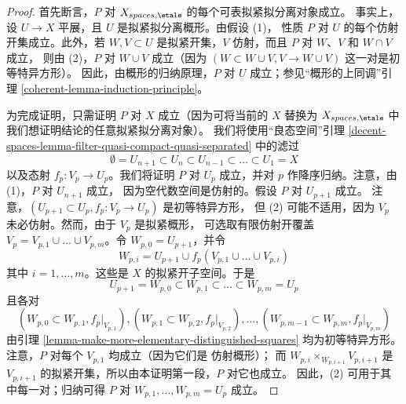 \begin{proof}
首先断言，$P$ 对 $X_{spaces, \etale}$ 的每个可表拟紧拟分离对象成立。
事实上，设 $U \to X$ 平展，且 $U$ 是拟紧拟分离概形。由假设 (1)，
性质 $P$ 对 $U$ 的每个仿射开集成立。此外，若 $W, V \subset U$
是拟紧开集，$V$ 仿射，而且 $P$ 对 $W$、$V$ 和 $W \cap V$ 成立，
则由 (2)，$P$ 对 $W \cup V$ 成立（因为
$(W \subset W \cup V, V \to W \cup V)$ 这一对是初等特异方形）。
因此，由概形的归纳原理，$P$ 对 $U$ 成立；参见“概形的上同调”引理
\ref{coherent-lemma-induction-principle}。

\medskip\noindent
为完成证明，只需证明 $P$ 对 $X$ 成立（因为可将当前的 $X$ 替换为
$X_{spaces, \etale}$ 中我们想证明结论的任意拟紧拟分离对象）。
我们将使用“良态空间”引理
\ref{decent-spaces-lemma-filter-quasi-compact-quasi-separated} 中的滤过
$$
\emptyset = U_{n + 1} \subset
U_n \subset U_{n - 1} \subset \ldots \subset U_1 = X
$$
以及态射 $f_p : V_p \to U_p$。我们将证明 $P$ 对 $U_p$ 成立，并对
$p$ 作降序归纳。注意，由 (1)，$P$ 对 $U_{n + 1}$ 成立，
因为空代数空间是仿射的。假设 $P$ 对 $U_{p + 1}$ 成立。
注意，$(U_{p + 1} \subset U_p, f_p : V_p \to U_p)$ 是初等特异方形，
但 (2) 可能不适用，因为 $V_p$ 未必仿射。然而，由于 $V_p$ 是拟紧概形，
可选取有限仿射开覆盖
$V_p = V_{p, 1} \cup \ldots \cup V_{p, m}$。令
$W_{p, 0} = U_{p + 1}$，并令
$$
W_{p, i} = U_{p + 1} \cup f_p(V_{p, 1} \cup \ldots \cup V_{p, i})
$$
其中 $i = 1, \ldots, m$。这些是 $X$ 的拟紧开子空间。于是
$$
U_{p + 1} = W_{p, 0} \subset
W_{p, 1} \subset \ldots \subset
W_{p, m} = U_p
$$
且各对
$$
(W_{p, 0} \subset W_{p, 1}, f_p|_{V_{p, 1}}),
(W_{p, 1} \subset W_{p, 2}, f_p|_{V_{p, 2}}),\ldots,
(W_{p, m - 1} \subset W_{p, m}, f_p|_{V_{p, m}})
$$
由引理 \ref{lemma-make-more-elementary-distinguished-squares}
均为初等特异方形。注意，$P$ 对每个 $V_{p, 1}$ 均成立（因为它们是
仿射概形）； %
而 $W_{p, i} \times_{W_{p, i + 1}} V_{p, i + 1}$ 是
$V_{p, i + 1}$ 的拟紧开集，所以由本证明第一段，$P$ 对它也成立。
因此，(2) 可用于其中每一对；归纳可得 $P$ 对
$W_{p, 1}, \ldots, W_{p, m} = U_p$ 成立。
\end{proof}

